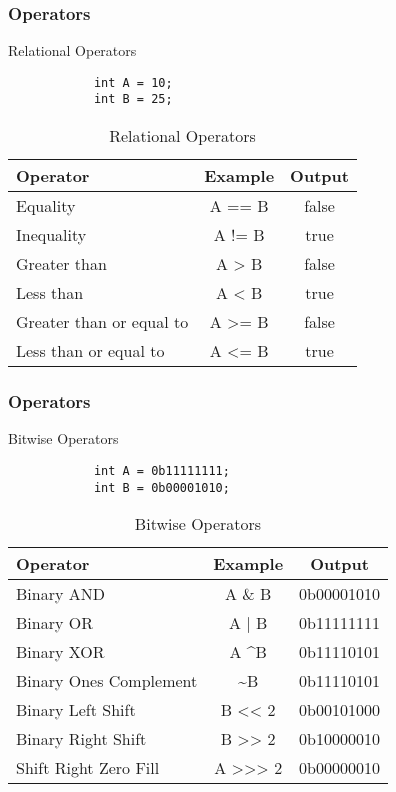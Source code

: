 \documentclass[10pt, compress]{beamer}
\begin{document}
\begin{frame}[fragile]
	\frametitle{Operators}
	\begin{block}{Relational Operators}
		\begin{verbatim}
			int A = 10;
			int B = 25;
		\end{verbatim}
		\begin{table}
			\begin{tabular}{lcc}
				\toprule
				Operator & Example & Output\\
				\midrule
				Equality & A == B & false\\
				Inequality & A != B & true\\
				Greater than & A > B & false\\
				Less than & A < B & true\\
				Greater than or equal to & A >= B & false\\
				Less than or equal to & A <= B & true\\
				\bottomrule
			\end{tabular}
			\caption{Relational Operators}
		\end{table}
	\end{block}
\end{frame}

\begin{frame}[fragile]
	\frametitle{Operators}
	\begin{block}{Bitwise Operators}
		\begin{verbatim}
			int A = 0b11111111;
			int B = 0b00001010;
		\end{verbatim}
		\begin{table}
			\begin{tabular}{lcc}
				\toprule
				Operator & Example & Output\\
				\midrule
				Binary AND & A \& B & 0b00001010\\
				Binary OR & A | B & 0b11111111\\
				Binary XOR & A \textasciicircum B & 0b11110101\\
				Binary Ones Complement & \textasciitilde B & 0b11110101\\
				Binary Left Shift & B <{}< 2 & 0b00101000\\
				Binary Right Shift & B >{}> 2 & 0b10000010\\
				Shift Right Zero Fill & A >{}>{}> 2 & 0b00000010 \\
				\bottomrule
			\end{tabular}
			\caption{Bitwise Operators}
		\end{table}
	\end{block}
\end{frame}
\end{document}
